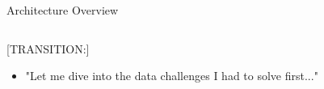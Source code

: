 \begin{frame}{Architecture Overview}
{\begin{columns}[T]
\begin{column}{0.49\textwidth}
	  \vspace{0.2cm}
	  [TRANSITION:]
	  \begin{itemize}
		\item "Let me dive into the data challenges I had to solve first..."
	  \end{itemize}
	\end{column}
  \end{columns}
}

\end{frame}
